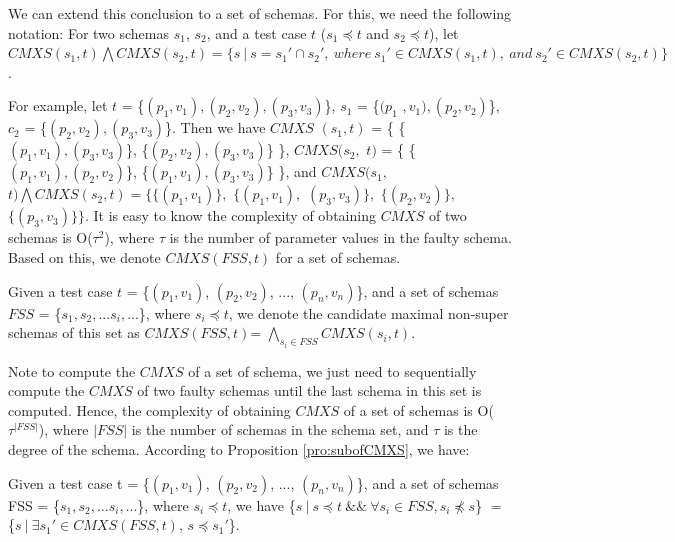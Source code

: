%


We can extend this conclusion to a set of schemas. For this, we need the following notation: For two schemas $s_{1}$, $s_{2}$, and a test case $t$ ($s_{1} \preceq t$ and $s_{2} \preceq t$), let $CMXS(s_{1}, t) \bigwedge CMXS(s_{2}, t)  = \{ s\ |\ s = s_{1}' \cap s_{2}',\ where\ s_{1}' \in CMXS(s_{1}, t),\ and\ s_{2}' \in CMXS(s_{2}, t) \}$.

For example, let $t$ = \{$(p_{1},v_{1}), (p_{2}, v_{2}), (p_{3}, v_{3})$\}, $s_{1}$ = \{$(p_{1}$ $, v_{1}), (p_{2}, v_{2})$\}, $c_{2}$ = \{$(p_{2}, v_{2}), (p_{3}, v_{3})$\}. Then we have $CMXS$ $(s_{1}, t)$ = \{ \{$(p_{1}, v_{1}), (p_{3}, v_{3})$\}, \{$(p_{2}, v_{2}), (p_{3}, v_{3})$\} \}, $CMXS(s_{2},$ $ t)$ = \{ \{$(p_{1}, v_{1}), (p_{2}, v_{2})$\}, \{$(p_{1}, v_{1}), (p_{3}, v_{3})$\} \}, and  $CMXS(s_{1},$ $ t) \bigwedge CMXS(s_{2}, t) = \{ \{(p_{1}, v_{1})\},$ $ \{(p_{1}, v_{1}), $ $(p_{3}, v_{3})\}, $ $ \{(p_{2}, v_{2})\}, $ $\{(p_{3}, v_{3})\} \} $. It is easy to know the complexity of obtaining $CMXS$ of two schemas is O($\tau^{2}$), where $\tau$ is the number of parameter values in the faulty schema. Based on this, we denote $CMXS(FSS,t)$ for a set of schemas.

\begin{definition}
Given a test case $t$ = \{$(p_{1}, v_{1})$, $(p_{2}, v_{2})$, ..., $(p_{n}, v_{n})$\}, and a set of schemas $FSS$ = \{$s_{1} , s_{2}, ... s_{i}, ...$\}, where $ s_{i} \preceq t$,  we denote the candidate maximal non-super schemas of this set as $CMXS(FSS,t)$= $\bigwedge_{s_{i}\in FSS} CMXS(s_{i}, t)$.
\end{definition}

Note to compute the $CMXS$ of a set of schema, we just need to sequentially compute the $CMXS$ of two faulty schemas until the last schema in this set is computed. Hence, the complexity of obtaining $CMXS$ of a set of schemas is O($\tau^{|FSS|}$), where $|FSS|$ is the number of schemas in the schema set, and $\tau$ is the degree of the schema. According to Proposition \ref{pro:subofCMXS}, we have:

\begin{proposition}\label{pro:subofCMXSfor2}
Given a test case t = \{$(p_{1}, v_{1})$, $(p_{2}, v_{2})$, ..., $(p_{n}, v_{n})$\}, and a set of schemas FSS = \{$s_{1} , s_{2}, ... s_{i}, ...$\}, where $ s_{i} \preceq t$,  we have \{$s\ |\ s \preceq t\ \&\&\ \forall s_{i} \in FSS, s_{i} \npreceq s $\} $=$  \{$ s\ |\ \exists s_{1}' \in CMXS(FSS, t)$, $s \preceq s_{1}'$\}.
\end{proposition}

